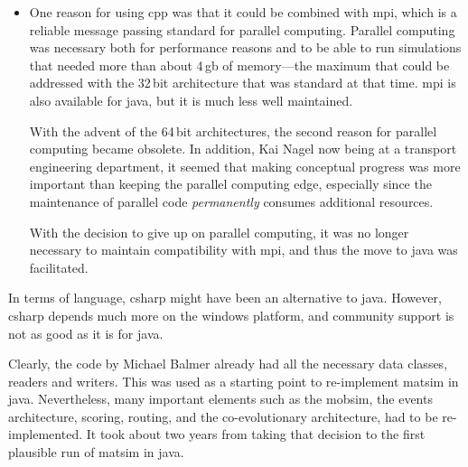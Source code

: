\begin{itemize}


In addition, it seems that the gap between \gls{cpp} and \gls{java} has narrowed further since then.  Important differences remain in numerical applications, in part also because \gls{cpp}, other than the \gls{java}, allows operator overloading.\footnote{See \url{http://en.wikipedia.org/wiki/Operator_overloading}.}  However, the agent-based approach of \gls{matsim} means that the handling of complex objects happens much more frequently than true numerical computations.

\item One reason for using \gls{cpp} was that it could be combined with \gls{mpi}, which is a reliable message passing standard for parallel computing.  Parallel computing was necessary both for performance reasons and to be able to run simulations that needed more than about 4\,\gls{gb} of memory---the maximum that could be addressed with the 32\,bit architecture that was standard at that time.  \gls{mpi} is also available for \gls{java}, but it is much less well maintained.

With the advent of the 64\,bit architectures, the second reason for parallel computing became obsolete. In addition, Kai Nagel now being at a transport engineering department, it seemed that making conceptual progress was more important than keeping the parallel computing edge, especially since the maintenance of parallel code \emph{permanently} consumes additional resources.

With the decision to give up on parallel computing, it was no longer necessary to maintain compatibility with \gls{mpi}, and thus the move to \gls{java} was facilitated.

\end{itemize}
%
In terms of language, \gls{csharp} might have been an alternative to \gls{java}.  However, \gls{csharp} depends much more on the \gls{windows} platform, and community support is not as good as it is for \gls{java}.

Clearly, the code by Michael Balmer already had all the necessary data classes, readers and writers.  This was used as a starting point to re-implement \gls{matsim} in \gls{java}.  Nevertheless, many important elements such as the \gls{mobsim}, the events architecture, scoring, routing, and the co-evolutionary architecture, had to be re-implemented.  It took about two years from taking that decision to the first plausible run of \gls{matsim} in \gls{java}.


